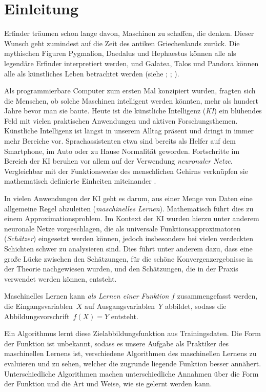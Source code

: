 \chapter*{Einleitung}

Erfinder träumen schon lange davon, Maschinen zu schaffen, die denken. Dieser Wunsch geht zumindest auf die Zeit des antiken Griechenlands zurück. Die mythischen Figuren Pygmalion, Daedalus und Hephaestus können alle als legendäre Erfinder interpretiert werden, und Galatea, Talos und Pandora können alle als künstliches Leben betrachtet werden (siehe \cite{2005metamorphoses}; \cite{sparkes1996red}; \cite{hesiod1996works}).

Als programmierbare Computer zum ersten Mal konzipiert wurden, fragten sich die Menschen, ob solche Maschinen intelligent werden könnten, mehr als hundert Jahre bevor man sie baute. Heute ist die künstliche Intelligenz (\emph{KI}) ein blühendes Feld mit vielen praktischen Anwendungen und aktiven Forschungsthemen. 
Künstliche Intelligenz ist längst in unserem Alltag präsent und dringt in immer mehr Bereiche vor. Sprachassistenten etwa sind bereits als Helfer auf dem Smartphone, im Auto oder zu Hause Normalität geworden. Fortschritte im Bereich der KI beruhen vor allem auf der Verwendung \emph{neuronaler Netze}. Vergleichbar mit der Funktionsweise des menschlichen Gehirns verknüpfen sie mathematisch definierte Einheiten miteinander \cite{goodfellow2016deep}.

In vielen Anwendungen der KI geht es darum, aus einer Menge von Daten eine allgemeine Regel abzuleiten (\emph{maschinelles Lernen}). Mathematisch führt dies zu einem Approximationsproblem. 
Im Kontext der KI wurden hierzu unter anderem neuronale Netze vorgeschlagen, die als universale Funktionsapproximatoren (\emph{Schätzer}) eingesetzt werden können, jedoch insbesondere bei vielen verdeckten Schichten schwer zu analysieren sind. 
Dies führt unter anderem dazu, dass eine große Lücke zwischen den Schätzungen, für die schöne Konvergenzergebnisse in der Theorie nachgewiesen wurden, und den Schätzungen, die in der Praxis verwendet werden können, entsteht.

Maschinelles Lernen kann \emph{als Lernen einer Funktion} $f$ zusammengefasst werden, die Eingangsvariablen~$X$ auf Ausgangsvariablen~$Y$ abbildet, sodass die Abbildungsvorschrift~$f(X) = Y$ entsteht.

Ein Algorithmus lernt diese Zielabbildungsfunktion aus Trainingsdaten.
Die Form der Funktion ist unbekannt, sodass es unsere Aufgabe als Praktiker des maschinellen Lernens ist, verschiedene Algorithmen des maschinellen Lernens zu evaluieren und zu sehen, welcher die zugrunde liegende Funktion besser annähert.
Unterschiedliche Algorithmen machen unterschiedliche Annahmen über die Form der Funktion und die Art und Weise, wie sie gelernt werden kann.

